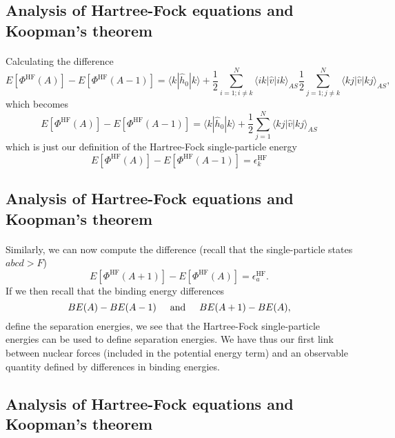 \documentclass[%
twoside,                 %
final,                   %
10pt]{article}
\begin{document}
\subsection{Analysis of Hartree-Fock equations and Koopman's theorem}

\paragraph{}
Calculating the difference 
\[
  E[\Phi^{\mathrm{HF}}(A)]-   E[\Phi^{\mathrm{HF}}(A-1)] 
  = \langle k | \hat{h}_0 | k \rangle +
  \frac{1}{2}\sum_{i=1;i\ne k}^N\langle ik|\hat{v}|ik\rangle_{AS}  \frac{1}{2}\sum_{j=1;j\ne k}^N\langle kj|\hat{v}|kj\rangle_{AS},
\]
which becomes 
\[
  E[\Phi^{\mathrm{HF}}(A)]-   E[\Phi^{\mathrm{HF}}(A-1)] 
  = \langle k | \hat{h}_0 | k \rangle +
  \frac{1}{2}\sum_{j=1}^N\langle kj|\hat{v}|kj\rangle_{AS}
\]
which is just our definition of the Hartree-Fock single-particle energy
\[
  E[\Phi^{\mathrm{HF}}(A)]-   E[\Phi^{\mathrm{HF}}(A-1)] 
  = \epsilon_k^{\mathrm{HF}} 
\]



\subsection{Analysis of Hartree-Fock equations and Koopman's theorem}

\paragraph{}
Similarly, we can now compute the difference (recall that the single-particle states $abcd > F$)
\[
  E[\Phi^{\mathrm{HF}}(A+1)]-   E[\Phi^{\mathrm{HF}}(A)]= \epsilon_a^{\mathrm{HF}}. 
\]
If we then recall that the binding energy differences 
\[
BE(A)-BE(A-1) \hspace{0.5cm} \mathrm{and} \hspace{0.5cm} BE(A+1)-BE(A), 
\]
define the separation energies, we see that the Hartree-Fock single-particle energies can be used to
define separation energies. We have thus our first link between nuclear forces (included in the potential energy term) and an observable quantity defined by differences in binding energies.



\subsection{Analysis of Hartree-Fock equations and Koopman's theorem}
\end{document}
